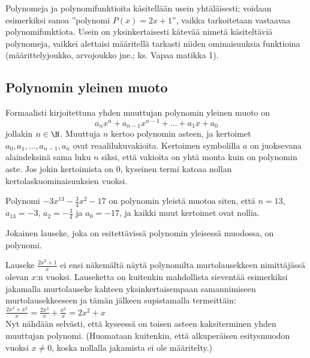 Polynomeja ja polynomifunktioita käsitellään usein yhtäläisesti; voidaan esimerkiksi sanoa ''polynomi $P(x)=2x+1$'', vaikka tarkoitetaan vastaavaa polynomifunktiota. Usein on yksinkertaisesti kätevää nimetä käsiteltäviä polynomeja, vaikkei alettaisi määritellä tarkasti niiden ominaisuuksia funktioina (määrittelyjoukko, arvojoukko jne.; ks. Vapaa matikka 1).


\subsection*{Polynomin yleinen muoto}

Formaalisti kirjoitettuna yhden muuttujan polynomin yleinen muoto on
\[a_n x^n + a_{n-1} x^{n-1} + \ldots + a_1 x + a_0 \] 
jollakin $n\in\N$. Muuttuja $n$ kertoo polynomin asteen, ja kertoimet $a_0, a_1, \ldots, a_{n-1}, a_n$ ovat reaalilukuvakioita. Kertoimen symbolilla $a$ on juoksevana alaindeksinä sama luku $n$ siksi, että vakioita on yhtä monta kuin on polynomin aste. Jos jokin kertoimista on $0$, kyseinen termi katoaa nollan kertolaskuominaisuuksien vuoksi.

\begin{esimerkki}

Polynomi $-3x^{13}-\frac{3}{4}x^2-17$ on polynomin yleistä muotoa siten, että $n=13$, $a_{13}=-3$, $a_2=-\frac{3}{4}$ ja $a_0=-17$, ja kaikki muut kertoimet ovat nollia.

\end{esimerkki}
 
Jokainen lauseke, joka on esitettävissä polynomin yleisessä muodossa, on polynomi.

\begin{esimerkki}

Lauseke $\frac{2x^2+1}{x}$ ei ensi näkemältä näytä polynomilta murtolausekkeen nimittäjässä olevan $x$:n vuoksi. Lauseketta on kuitenkin mahdollista sieventää esimerkiksi jakamalla murtolauseke kahteen yksinkertaisempaan samannimiseen murtolausekkeeseen ja tämän jälkeen supistamalla termeittäin: \\


$\frac{2x^3+x^2}{x} = \frac{2x^3}{x}+\frac{x^2}{x} = 2x^2+x $ \\

Nyt nähdään selvästi, että kyseessä on toisen asteen kaksiterminen yhden muuttujan polynomi. (Huomataan kuitenkin, että alkuperäisen esitysmuodon vuoksi $x \neq 0$, koska nollalla jakamista ei ole määritelty.)

\end{esimerkki}

